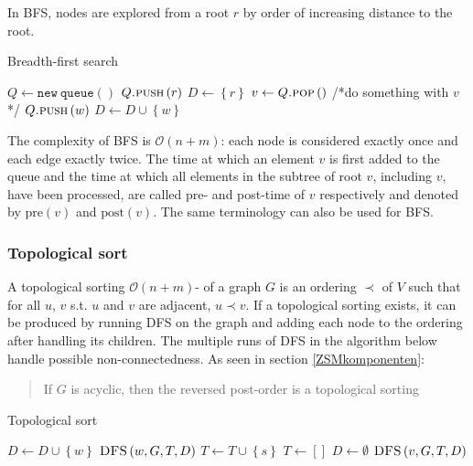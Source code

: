 \documentclass[a4paper]{article}
\begin{document}
In BFS, nodes are explored from a root $r$ by order of increasing distance to the root.
\begin{algorithm}[H]
  \caption{Breadth-first search}
  \begin{algorithmic}
    \State $Q \gets \texttt{new}~\texttt{queue}\left(\right)$
    \State $Q\textsc{.push}\left(r\right)$
    \State $D \gets \left\lbrace r \right\rbrace$ 
    \State $v \gets Q\textsc{.pop}\left(\right)$
    \State /*do something with $v$*/
    \State $Q\textsc{.push}\left(w\right)$
    \State $D \gets D \cup \left\lbrace w \right\rbrace$
    \EndIf
    \EndFor
    \EndWhile
    \label{alg:BFS-Algorithm}
  \end{algorithmic}
\end{algorithm}

The complexity of BFS is $\mathcal{O}(n + m)$: each node is considered exactly once and each edge exactly twice. The time at which an element $v$ is first added to the queue and the time at which all elements in the subtree of root $v$, including $v$, have been processed, are called pre- and post-time of $v$ respectively and denoted by $\mathrm{pre}\left(v\right)$ and $\mathrm{post}\left(v\right)$. The same terminology can also be used for BFS. 


\subsubsection{Topological sort}
A topological sorting $\mathcal{O}(n + m)$- of a graph $G$ is an ordering $\prec$ of $V$ such that for all $u$, $v$ s.t. $u$ and $v$ are adjacent, $u \prec v$. If a topological sorting exists, it can be produced by running DFS on the graph and adding each node to the ordering after handling its children. The multiple runs of DFS in the algorithm below handle possible non-connectedness. As seen in section \ref{ZSMkomponenten}: 
\begin{quote}
    If $G$ is acyclic, then the reversed post-order is a topological sorting
\end{quote}

\begin{algorithm}[H]
  \caption{Topological sort}
  \begin{algorithmic}
    \State $D \gets D \cup \left\lbrace w \right\rbrace$
    \State $\textsc{DFS}\left(w, G, T, D\right)$
    \EndIf
    \EndFor
    \State $T \gets T \cup \left\lbrace s \right\rbrace$
    \EndFunction
    \State $T \gets \left[\right]$
    \State $D \gets \emptyset$
    \State $\textsc{DFS}\left(v, G, T, D\right)$
    \EndIf
    \EndFor
  \end{algorithmic}
\end{algorithm}
\end{document}
